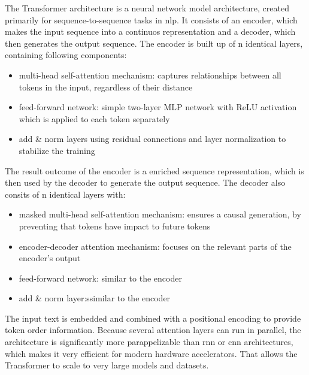 \documentclass[conference]{IEEEtran}
\begin{document}
The Transformer architecture is a neural network model architecture, created primarily for sequence-to-sequence tasks in \ac{nlp}. It consists of an encoder, which makes the input sequence into a continuos representation and a decoder, which then generates the output sequence. The encoder is built up of n identical layers, containing following components:
\begin{itemize}
  \item multi-head self-attention mechanism: captures relationships between all tokens in the input, regardless of their distance
  \item feed-forward network: simple two-layer MLP network with ReLU activation which is applied to each token separately
  \item add \& norm layers using residual connections and layer normalization to stabilize the training
\end{itemize}
The result outcome of the encoder is a enriched sequence representation, which is then used by the decoder to generate the output sequence. The decoder also consits of n identical layers with:
\begin{itemize}
  \item masked multi-head self-attention mechanism: ensures a causal generation, by preventing that tokens have impact to future tokens
  \item encoder-decoder attention mechanism: focuses on the relevant parts of the encoder's output
  \item feed-forward network: similar to the encoder
  \item add \& norm layer:ssimilar to the encoder
\end{itemize}
The input text is embedded and combined with a positional encoding to provide token order information. Because several attention layers can run in parallel, the architecture is significantly more parappelizable than \ac{rnn} or \ac{cnn} architectures, which makes it very efficient for modern hardware accelerators. That allows the Transformer to scale to very large models and datasets. \cite{transformer2017}
\end{document}
